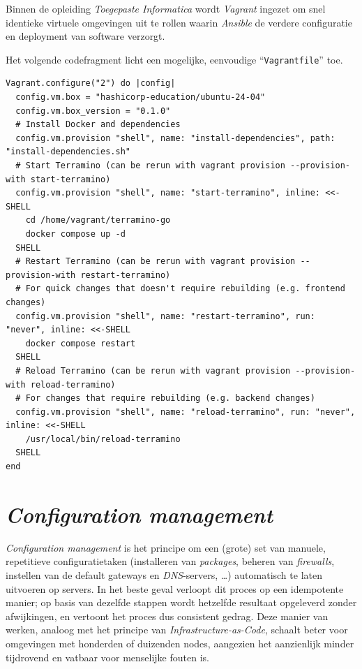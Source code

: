 Binnen de opleiding \emph{Toegepaste Informatica} wordt \emph{Vagrant} ingezet om snel identieke virtuele omgevingen uit te rollen waarin \emph{Ansible} de verdere configuratie en deployment van software verzorgt.

Het volgende codefragment licht een mogelijke, eenvoudige ``\texttt{Vagrantfile}'' toe.

\begin{codeblock}
  \begin{verbatim}
Vagrant.configure("2") do |config|
  config.vm.box = "hashicorp-education/ubuntu-24-04"
  config.vm.box_version = "0.1.0"
  # Install Docker and dependencies
  config.vm.provision "shell", name: "install-dependencies", path: "install-dependencies.sh"
  # Start Terramino (can be rerun with vagrant provision --provision-with start-terramino)
  config.vm.provision "shell", name: "start-terramino", inline: <<-SHELL
    cd /home/vagrant/terramino-go
    docker compose up -d
  SHELL
  # Restart Terramino (can be rerun with vagrant provision --provision-with restart-terramino)
  # For quick changes that doesn't require rebuilding (e.g. frontend changes)
  config.vm.provision "shell", name: "restart-terramino", run: "never", inline: <<-SHELL
    docker compose restart
  SHELL
  # Reload Terramino (can be rerun with vagrant provision --provision-with reload-terramino)
  # For changes that require rebuilding (e.g. backend changes)
  config.vm.provision "shell", name: "reload-terramino", run: "never", inline: <<-SHELL
    /usr/local/bin/reload-terramino
  SHELL
end
\end{verbatim}
  \caption[Voorbeeld ``\texttt{Vagrantfile}'']{Voorbeeld van een eenvoudige ``\texttt{Vagrantfile}'' \autocite{HashiCorp2024a}.}
  \label{code:vagrantfile_vb}
\end{codeblock}

\section{\emph{Configuration management}}%

\emph{Configuration management} is het principe om een (grote) set van manuele, repetitieve configuratietaken (installeren van \emph{packages}, beheren van \emph{firewalls}, instellen van de default gateways en \emph{DNS}-servers, \ldots) automatisch te laten uitvoeren op servers. In het beste geval verloopt dit proces op een idempotente manier; op basis van dezelfde stappen wordt hetzelfde resultaat opgeleverd zonder afwijkingen, en vertoont het proces dus consistent gedrag. Deze manier van werken, analoog met het principe van \emph{Infrastructure-as-Code}, schaalt beter voor omgevingen met honderden of duizenden nodes, aangezien het aanzienlijk minder tijdrovend en vatbaar voor menselijke fouten is. \autocite{Likitha2022}

